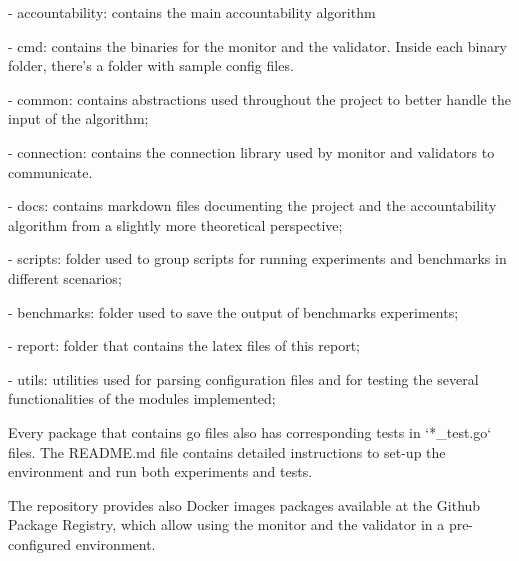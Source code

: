 \documentclass[a4paper,11pt,oneside]{report}
\begin{document}
\begin{markdown}
- accountability: contains the main accountability algorithm

- cmd: contains the binaries for the monitor and the validator. Inside each binary folder, there's a folder with sample config files. 

- common: contains abstractions used throughout the project to better handle the input of the algorithm;

- connection: contains the connection library used by monitor and validators to communicate.

- docs: contains markdown files documenting the project and the accountability algorithm from a slightly more theoretical perspective; 

- scripts: folder used to group scripts for running experiments and benchmarks in different scenarios;

- benchmarks: folder used to save the output of benchmarks experiments;

- report: folder that contains the latex files of this report;

- utils: utilities used for parsing configuration files and for testing the several functionalities of the modules implemented;

Every package that contains go files also has corresponding tests in `*_test.go` files. The README.md file contains detailed instructions to set-up the environment and run both experiments and tests.

The repository provides also Docker images packages available at the Github Package Registry, which allow using the monitor and the validator in a pre-configured environment. 

\end{markdown}
\end{document}
